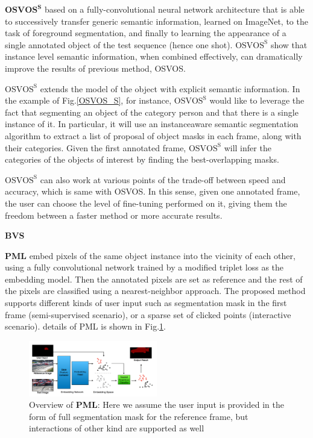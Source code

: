 $\textbf{OSVOS}^\textbf{S}$\cite{OSVOS-S} based on a fully-convolutional neural network architecture that is able to successively transfer generic semantic information, learned on ImageNet, to the task of foreground segmentation, and finally to learning the appearance of a single annotated object of the test sequence (hence one shot). $\text{OSVOS}^\text{S}$ show that instance level semantic information, when combined effectively, can dramatically improve the results of previous method, OSVOS\cite{OSVOS}.

$\text{OSVOS}^\text{S}$ extends the model of the object with explicit semantic information. In the example of Fig.\ref{OSVOS_S}, for instance, $\text{OSVOS}^\text{S}$ would like to leverage the fact that segmenting an object of the category person and that there is a single instance of it. In particular, it will use an instanceaware semantic segmentation algorithm to extract a list of proposal of object masks in each frame, along with their categories. Given the first annotated frame, $\text{OSVOS}^\text{S}$ will infer the categories of the objects of interest by finding the best-overlapping masks.



$\text{OSVOS}^\text{S}$ can also work at various points of the trade-off between speed and accuracy, which is same with OSVOS. In this sense, given one annotated frame, the user can choose the level of fine-tuning performed on it, giving them the freedom between a faster method or more accurate results.



\textbf{BVS}\cite{BVS}

\textbf{PML}\cite{PML} embed pixels of the same object instance into the vicinity of each other, using a fully convolutional network trained by a modified triplet loss as the embedding model. Then the annotated pixels are set as reference and the rest of the pixels are classified using a nearest-neighbor approach. The proposed method supports different kinds of user input such as segmentation mask in the first frame (semi-supervised scenario), or a sparse set of clicked points (interactive scenario). details of PML is shown in Fig.\ref{PML}.

\begin{figure}[ht]
    \centering
    \includegraphics[width=0.5\textwidth]{./figure/PML.png}
    \caption{Overview of \textbf{PML}: Here we assume the user input is provided in the form of full segmentation mask for the reference frame, but interactions of other kind are supported as well}
    \label{PML}
\end{figure}


